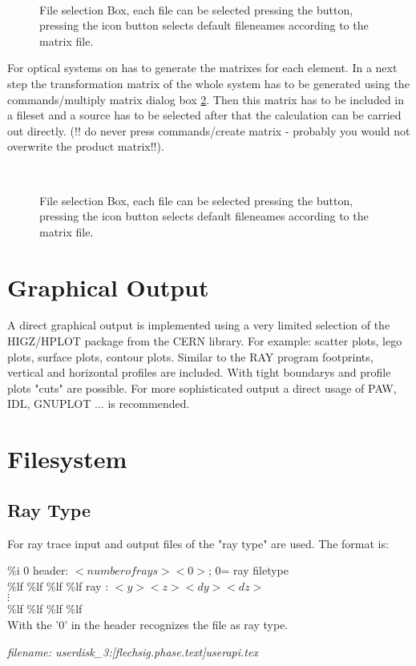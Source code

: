 \begin{figure}
\centerline{ \hbox{
 }}  
  \caption {\label{fseldia} File selection Box, each file can be selected
pressing the button, pressing the icon button selects default fileneames
according to the matrix file.} 
\end {figure}  
   
For optical systems on has to generate the matrixes for each element. In a next
step the transformation matrix of the whole system has to be generated using
the commands/multiply matrix dialog box \ref {mbox}. Then this matrix has to be
included in a fileset and a source has to be selected after that the
calculation can be carried out directly. (!! do never press commands/create 
matrix - probably you would not overwrite the product matrix!!). 

\begin{figure}
\centerline{ \hbox{
 }}  
  \caption {\label{mbox} File selection Box, each file can be selected
pressing the button, pressing the icon button selects default fileneames
according to the matrix file.} 
\end {figure}    



\section{Graphical Output}
A direct graphical output is implemented using a very limited selection
of the HIGZ/HPLOT package from the CERN library. For example: scatter plots,
lego plots, surface plots, contour plots. Similar to the RAY program
footprints, vertical and horizontal profiles are included. With tight
boundarys and profile plots  "cuts" are possible.
For more sophisticated output
a direct usage of PAW, IDL, GNUPLOT $\ldots$ is recommended.


\section {Filesystem}

\subsection {Ray Type}
 
For ray trace input and output files of the "ray type" are used. The 
format is:

\%i 0                  header: $<number of rays> <0>$; 0= ray filetype \\
\%lf \%lf \%lf \%lf       ray : $<y> <z> <dy> <dz> $        \\
 $\vdots$                                                  \\
\%lf \%lf \%lf \%lf        \\

With the  '0' in the header  \phase recognizes the file as ray type.
 

{\it filename: userdisk\_3:[flechsig.phase.text]userapi.tex}  

